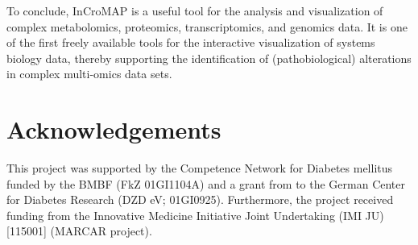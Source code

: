\documentclass[final,5p,times,twocolumn]{elsarticle}
\begin{document}
To conclude, InCroMAP is a useful tool for the analysis and visualization of complex metabolomics, proteomics, transcriptomics, and genomics data. It is one of the first freely available tools for the interactive visualization of systems biology data, thereby supporting the identification of (pathobiological) alterations in complex multi-omics data sets.

\section{Acknowledgements}
This project was supported by the Competence Network for Diabetes mellitus funded by the BMBF (FkZ 01GI1104A) and a grant from to the German Center for Diabetes Research (DZD eV; 01GI0925). Furthermore, the project received funding from the Innovative Medicine Initiative Joint Undertaking (IMI JU) [115001] (MARCAR project).














\end{document}

